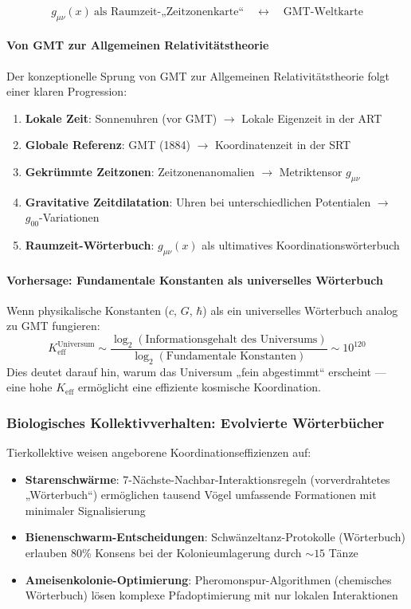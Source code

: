 \documentclass[11pt,a4paper]{article}
\begin{document}
	\begin{equation}
		g_{\mu\nu}(x) \ \text{als Raumzeit-„Zeitzonenkarte“} \quad \leftrightarrow \quad \text{GMT-Weltkarte}
	\end{equation}
	
	\paragraph{Von GMT zur Allgemeinen Relativitätstheorie}
	Der konzeptionelle Sprung von GMT zur Allgemeinen Relativitätstheorie folgt einer klaren Progression:
	\begin{enumerate}
		\item \textbf{Lokale Zeit}: Sonnenuhren (vor GMT) $\rightarrow$ Lokale Eigenzeit in der ART
		\item \textbf{Globale Referenz}: GMT (1884) $\rightarrow$ Koordinatenzeit in der SRT
		\item \textbf{Gekrümmte Zeitzonen}: Zeitzonenanomalien $\rightarrow$ Metriktensor $g_{\mu\nu}$
		\item \textbf{Gravitative Zeitdilatation}: Uhren bei unterschiedlichen Potentialen $\rightarrow$ $g_{00}$-Variationen
		\item \textbf{Raumzeit-Wörterbuch}: $g_{\mu\nu}(x)$ als ultimatives Koordinationswörterbuch
	\end{enumerate}
	
	\paragraph{Vorhersage: Fundamentale Konstanten als universelles Wörterbuch}
	Wenn physikalische Konstanten ($c$, $G$, $\hbar$) als ein universelles Wörterbuch analog zu GMT fungieren:
	\begin{equation}
		K_{\mathrm{eff}}^{\mathrm{Universum}} \sim \frac{\log_2(\text{Informationsgehalt des Universums})}{\log_2(\text{Fundamentale Konstanten})} \sim 10^{120}
	\end{equation}
	Dies deutet darauf hin, warum das Universum „fein abgestimmt“ erscheint — eine hohe $K_{\mathrm{eff}}$ ermöglicht eine effiziente kosmische Koordination.
	
	\subsubsection{Biologisches Kollektivverhalten: Evolvierte Wörterbücher}
	Tierkollektive weisen angeborene Koordinationseffizienzen auf:
	\begin{itemize}
		\item \textbf{Starenschwärme}: 7-Nächste-Nachbar-Interaktionsregeln (vorverdrahtetes „Wörterbuch“) ermöglichen tausend Vögel umfassende Formationen mit minimaler Signalisierung
		\item \textbf{Bienenschwarm-Entscheidungen}: Schwänzeltanz-Protokolle (Wörterbuch) erlauben 80\% Konsens bei der Kolonieumlagerung durch $\sim 15$ Tänze
		\item \textbf{Ameisenkolonie-Optimierung}: Pheromonspur-Algorithmen (chemisches Wörterbuch) lösen komplexe Pfadoptimierung mit nur lokalen Interaktionen
	\end{itemize}
	
\end{document}
